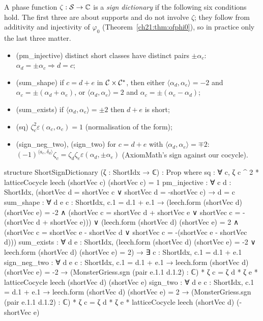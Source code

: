 \begin{definition}\label{ch21:def:ssd}
A phase function $\zeta:\mathcal{S}\to{\mathbb{C}}$ is a \emph{sign dictionary} if the following six conditions hold.
The first three are about supports and do not involve $\zeta$; they follow from additivity and
injectivity of $\varphi_0$ (Theorem~\ref{ch21:thm:ofphi0}), so in practice only the last three matter.
\begin{itemize}
\item (pm\_injective) distinct short classes have distinct pairs $\pm\alpha_c$: $\alpha_d=\pm\alpha_c\Rightarrow d=c$;
\item (sum\_shape) if $c=d+e$ in $\mathcal{C}\times\mathcal{C}^*$, then either $\langle\alpha_d,\alpha_e\rangle=-2$ and
  $\alpha_c=\pm(\alpha_d+\alpha_e)$, or $\langle\alpha_d,\alpha_e\rangle=2$ and $\alpha_c=\pm(\alpha_e-\alpha_d)$;
\item (sum\_exists) if $\langle\alpha_d,\alpha_e\rangle=\pm2$ then $d+e$ is short;
\item (sq) $\zeta_c^2\varepsilon(\alpha_c,\alpha_c)=1$ (normalisation of the form);
\item (sign\_neg\_two), (sign\_two) for $c=d+e$ with $\langle\alpha_d,\alpha_e\rangle=\mp2$:
  $(-1)^{\langle a_e,\delta_d\rangle}\zeta_c=\zeta_d\zeta_e\varepsilon(\alpha_d,\pm\alpha_e)$ (AxiomMath's sign
  against our cocycle).
\end{itemize}
\end{definition}
\begin{leancode}
structure ShortSignDictionary (ζ : ShortIdx → ℂ) : Prop where
  sq : ∀ c, ζ c ^ 2 * latticeCocycle leech (shortVec c) (shortVec c) = 1
  pm_injective : ∀ c d : ShortIdx, (shortVec d = shortVec c ∨ shortVec d = -shortVec c) → d = c
  sum_shape : ∀ d e c : ShortIdx, c.1 = d.1 + e.1 →
    (leech.form (shortVec d) (shortVec e) = -2 ∧
      (shortVec c = shortVec d + shortVec e ∨ shortVec c = -(shortVec d + shortVec e))) ∨
    (leech.form (shortVec d) (shortVec e) = 2 ∧
      (shortVec c = shortVec e - shortVec d ∨ shortVec c = -(shortVec e - shortVec d)))
  sum_exists : ∀ d e : ShortIdx, (leech.form (shortVec d) (shortVec e) = -2 ∨
    leech.form (shortVec d) (shortVec e) = 2) → ∃ c : ShortIdx, c.1 = d.1 + e.1
  sign_neg_two : ∀ d e c : ShortIdx, c.1 = d.1 + e.1 → leech.form (shortVec d) (shortVec e) = -2 →
    (MonsterGriess.sgn (pair e.1.1 d.1.2) : ℂ) * ζ c = ζ d * ζ e * latticeCocycle leech (shortVec d) (shortVec e)
  sign_two : ∀ d e c : ShortIdx, c.1 = d.1 + e.1 → leech.form (shortVec d) (shortVec e) = 2 →
    (MonsterGriess.sgn (pair e.1.1 d.1.2) : ℂ) * ζ c = ζ d * ζ e * latticeCocycle leech (shortVec d) (-shortVec e)
\end{leancode}
